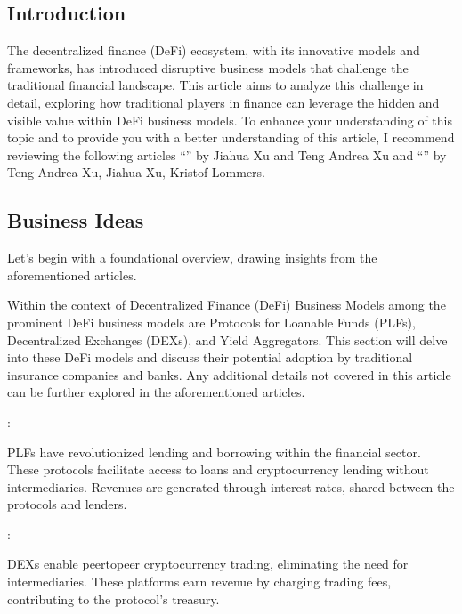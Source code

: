\documentclass[letterpaper,10pt,english]{jupyterBook}
\begin{document}
\subsection{Introduction}
\label{\detokenize{BOER/boer:introduction}}
\sphinxAtStartPar
The decentralized finance (DeFi) ecosystem, with its innovative models and frameworks, has introduced disruptive business models that challenge the traditional financial landscape. This article aims to analyze this challenge in detail, exploring how traditional players in finance can leverage the hidden and visible value within DeFi business models. To enhance your understanding of this topic and to provide you with a better understanding of this article, I recommend reviewing the following articles “” by Jiahua Xu and Teng Andrea Xu and “” by Teng Andrea Xu, Jiahua Xu, Kristof Lommers.


\subsection{Business Ideas}
\label{\detokenize{BOER/boer:business-ideas}}
\sphinxAtStartPar
Let’s begin with a foundational overview, drawing insights from the aforementioned articles.

\sphinxAtStartPar
Within the context of Decentralized Finance (DeFi) Business Models among the prominent DeFi business models are Protocols for Loanable Funds (PLFs), Decentralized Exchanges (DEXs), and Yield Aggregators. This section will delve into these DeFi models and discuss their potential adoption by traditional insurance companies and banks. Any additional details not covered in this article can be further explored in the aforementioned articles.

\sphinxAtStartPar
{}:

\sphinxAtStartPar
PLFs have revolutionized lending and borrowing within the financial sector. These protocols facilitate access to loans and cryptocurrency lending without intermediaries. Revenues are generated through interest rates, shared between the protocols and lenders.

\sphinxAtStartPar
{}:

\sphinxAtStartPar
DEXs enable peer\sphinxhyphen{}to\sphinxhyphen{}peer cryptocurrency trading, eliminating the need for intermediaries. These platforms earn revenue by charging trading fees, contributing to the protocol’s treasury.
\end{document}
